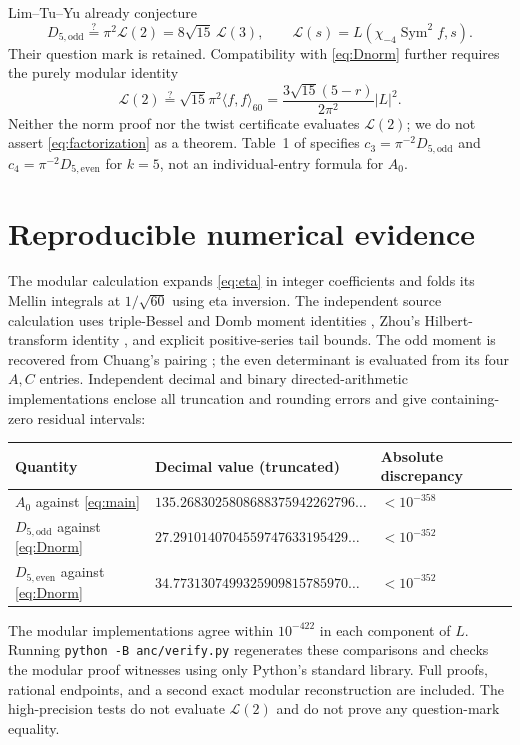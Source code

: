 \documentclass[11pt]{article}
\numberwithin{equation}{section}
\theoremstyle{definition}
\theoremstyle{remark}
\theoremstyle{plain}
\newcommand{\De}{D_{5,\mathrm{even}}}
\newcommand{\Do}{D_{5,\mathrm{odd}}}
\begin{document}
Lim--Tu--Yu already conjecture \cite[eq.~(44)]{LTY}
\begin{equation}\label{eq:LTY}
 \Do\stackrel?=\pi^2\mathscr L(2)=8\sqrt{15}\,\mathscr L(3),
 \qquad \mathscr L(s)=L(\chi_{-4}\operatorname{Sym}^2f,s).
\end{equation}
Their question mark is retained. Compatibility with \eqref{eq:Dnorm}
further requires the purely modular identity
\begin{equation}\label{eq:factorization}
 \mathscr L(2)\stackrel?=\sqrt{15}\pi^2\langle f,f\rangle_{60}
 =\frac{3\sqrt{15}(5-r)}{2\pi^2}|L|^2.
\end{equation}
Neither the norm proof nor the twist certificate evaluates
$\mathscr L(2)$; we do not assert \eqref{eq:factorization} as a theorem.
Table~1 of \cite{LTY} specifies $c_3=\pi^{-2}\Do$ and
$c_4=\pi^{-2}\De$ for $k=5$, not an individual-entry formula for $A_0$.

\section{Reproducible numerical evidence}
The modular calculation expands \eqref{eq:eta} in integer coefficients
and folds its Mellin integrals at $1/\sqrt{60}$ using eta inversion.
The independent source calculation uses triple-Bessel and Domb moment
identities \cite{BBBG}, Zhou's Hilbert-transform identity \cite[eq.~(3.1)]{Zhou},
and explicit positive-series tail bounds. The odd moment is recovered
from Chuang's pairing \cite{Chu}; the even determinant is evaluated from
its four $A,C$ entries. Independent decimal and binary directed-arithmetic
implementations enclose all truncation and rounding errors and give
containing-zero residual intervals:
\begin{center}
\begin{tabular}{lll}
\toprule
Quantity & Decimal value (truncated) & Absolute discrepancy\\
\midrule
$A_0$ against \eqref{eq:main} & $135.2683025808688375942262796\ldots$ & $<10^{-358}$\\
$\Do$ against \eqref{eq:Dnorm} & $27.2910140704559747633195429\ldots$ & $<10^{-352}$\\
$\De$ against \eqref{eq:Dnorm} & $34.7731307499325909815785970\ldots$ & $<10^{-352}$\\
\bottomrule
\end{tabular}
\end{center}
The modular implementations agree within $10^{-422}$ in each component of $L$.
Running \texttt{python -B anc/verify.py} regenerates these comparisons and
checks the modular proof witnesses using only Python's standard library.
Full proofs, rational endpoints, and a second exact modular reconstruction
are included. The high-precision tests do not evaluate $\mathscr L(2)$
and do not prove any question-mark equality.
\end{document}
